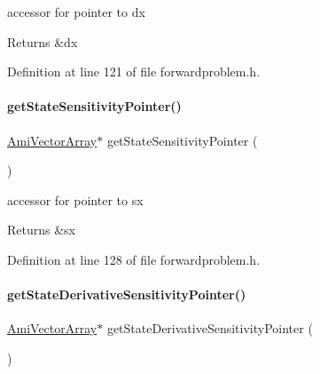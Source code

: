 accessor for pointer to dx \begin{DoxyReturn}{Returns}
\&dx 
\end{DoxyReturn}


Definition at line 121 of file forwardproblem.\+h.

\mbox{\label{classamici_1_1_forward_problem_a5ef9198bc0b08dc9e67efcd5dcf64ced}} 
\paragraph{\texorpdfstring{get\+State\+Sensitivity\+Pointer()}{getStateSensitivityPointer()}}
{\footnotesize\ttfamily \mbox{\hyperlink{classamici_1_1_ami_vector_array}{Ami\+Vector\+Array}}$\ast$ get\+State\+Sensitivity\+Pointer (\begin{DoxyParamCaption}{ }\end{DoxyParamCaption})}

accessor for pointer to sx \begin{DoxyReturn}{Returns}
\&sx 
\end{DoxyReturn}


Definition at line 128 of file forwardproblem.\+h.

\mbox{\label{classamici_1_1_forward_problem_a440eebbd8bf6a343ff7ee80ddc39b0a0}} 
\paragraph{\texorpdfstring{get\+State\+Derivative\+Sensitivity\+Pointer()}{getStateDerivativeSensitivityPointer()}}
{\footnotesize\ttfamily \mbox{\hyperlink{classamici_1_1_ami_vector_array}{Ami\+Vector\+Array}}$\ast$ get\+State\+Derivative\+Sensitivity\+Pointer (\begin{DoxyParamCaption}{ }\end{DoxyParamCaption})}

